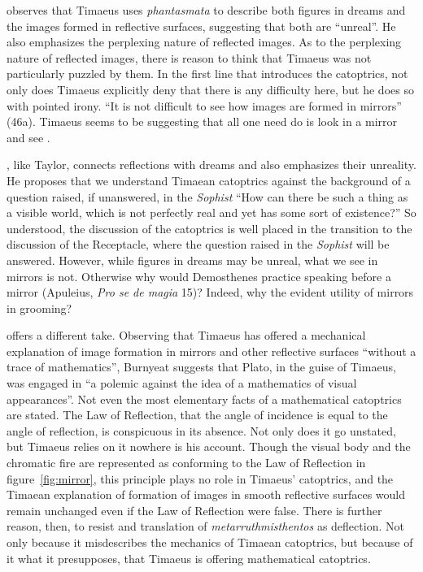 \citet[285]{Taylor:1928qb} observes that Timae\-us uses \emph{phantasmata} to describe both figures in dreams and the images formed in reflective surfaces, suggesting that both are ``unreal''. He also emphasizes the perplexing nature of reflected images. As to the perplexing nature of reflected images, there is reason to think that Timaeus was not particularly puzzled by them. In the first line that introduces the catoptrics, not only does Timaeus explicitly deny that there is any difficulty here, but he does so with pointed irony. ``It is not difficult to see how images are formed in mirrors'' (46a). Timaeus seems to be suggesting that all one need do is look in a mirror and see \citep[47]{Burnyeat:2005rc}. 

\citet[156]{Cornford:1935fk}, like Taylor, connects reflections with dreams and also emphasizes their unreality. He proposes that we understand Timaean catoptrics against the background of a question raised, if unanswered, in the \emph{Sophist} ``How can there be such a thing as a visible world, which is not perfectly real and yet has some sort of existence?'' So understood, the discussion of the catoptrics is well placed in the transition to the discussion of the Receptacle, where the question raised in the \emph{Sophist} will be answered. However, while figures in dreams may be unreal, what we see in mirrors is not. Otherwise why would Demosthenes practice speaking before a mirror (Apuleius, \emph{Pro se de magia} 15)? Indeed, why the evident utility of mirrors in grooming? 

\citet[47--8]{Burnyeat:2005rc} offers a different take. Observing that Timaeus has offered a mechanical explanation of image formation in mirrors and other reflective surfaces ``without a trace of mathematics'', Burnyeat suggests that Plato, in the guise of Timaeus, was engaged in ``a polemic against the idea of a mathematics of visual appearances''. Not even the most elementary facts of a mathematical catoptrics are stated. The Law of Reflection, that the angle of incidence is equal to the angle of reflection, is conspicuous in its absence. Not only does it go unstated, but Timaeus relies on it nowhere is his account. Though the visual body and the chromatic fire are represented as conforming to the Law of Reflection in figure~\ref{fig:mirror}, this principle plays no role in Timaeus' catoptrics, and the Timaean explanation of formation of images in smooth reflective surfaces would remain unchanged even if the Law of Reflection were false. There is further reason, then, to resist \citet[159]{Archer-Hind:1888qd} and \citet[103]{Bury:1929jb} translation of \emph{metarruthmisthentos} as deflection. Not only because it misdescribes the mechanics of Timaean catoptrics, but because of it what it presupposes, that Timaeus is offering mathematical catoptrics.

